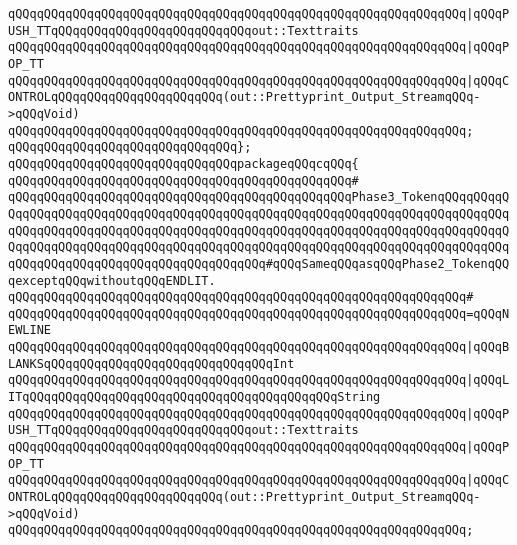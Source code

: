 \verb|qQQqqQQqqQQqqQQqqQQqqQQqqQQqqQQqqQQqqQQqqQQqqQQqqQQqqQQqqQQqqQQq|\verb#|qQQqPUSH_TTqQQqqQQqqQQqqQQqqQQqqQQqqQQqout::Texttraits#\newline
\verb|qQQqqQQqqQQqqQQqqQQqqQQqqQQqqQQqqQQqqQQqqQQqqQQqqQQqqQQqqQQqqQQq|\verb#|qQQqPOP_TT#\newline
\verb|qQQqqQQqqQQqqQQqqQQqqQQqqQQqqQQqqQQqqQQqqQQqqQQqqQQqqQQqqQQqqQQq|\verb#|qQQqCONTROLqQQqqQQqqQQqqQQqqQQqqQQq(out::Prettyprint_Output_StreamqQQq->qQQqVoid)#\newline
\verb|qQQqqQQqqQQqqQQqqQQqqQQqqQQqqQQqqQQqqQQqqQQqqQQqqQQqqQQqqQQqqQQq;|\newline
\verb|qQQqqQQqqQQqqQQqqQQqqQQqqQQqqQQq};|\newline
\newline
\verb|qQQqqQQqqQQqqQQqqQQqqQQqqQQqqQQqpackageqQQqcqQQq{|\newline
\verb|qQQqqQQqqQQqqQQqqQQqqQQqqQQqqQQqqQQqqQQqqQQqqQQq#|\newline
\verb|qQQqqQQqqQQqqQQqqQQqqQQqqQQqqQQqqQQqqQQqqQQqqQQqPhase3_TokenqQQqqQQqqQQqqQQqqQQqqQQqqQQqqQQqqQQqqQQqqQQqqQQqqQQqqQQqqQQqqQQqqQQqqQQqqQQqqQQqqQQqqQQqqQQqqQQqqQQqqQQqqQQqqQQqqQQqqQQqqQQqqQQqqQQqqQQqqQQqqQQqqQQqqQQqqQQqqQQqqQQqqQQqqQQqqQQqqQQqqQQqqQQqqQQqqQQqqQQqqQQqqQQqqQQqqQQqqQQqqQQqqQQqqQQqqQQqqQQqqQQqqQQqqQQqqQQq#qQQqSameqQQqasqQQqPhase2_TokenqQQqexceptqQQqwithoutqQQqENDLIT.|\newline
\verb|qQQqqQQqqQQqqQQqqQQqqQQqqQQqqQQqqQQqqQQqqQQqqQQqqQQqqQQqqQQqqQQq#|\newline
\verb|qQQqqQQqqQQqqQQqqQQqqQQqqQQqqQQqqQQqqQQqqQQqqQQqqQQqqQQqqQQqqQQq=qQQqNEWLINE|\newline
\verb|qQQqqQQqqQQqqQQqqQQqqQQqqQQqqQQqqQQqqQQqqQQqqQQqqQQqqQQqqQQqqQQq|\verb#|qQQqBLANKSqQQqqQQqqQQqqQQqqQQqqQQqqQQqqQQqInt#\newline
\verb|qQQqqQQqqQQqqQQqqQQqqQQqqQQqqQQqqQQqqQQqqQQqqQQqqQQqqQQqqQQqqQQq|\verb#|qQQqLITqQQqqQQqqQQqqQQqqQQqqQQqqQQqqQQqqQQqqQQqqQQqString#\newline
\verb|qQQqqQQqqQQqqQQqqQQqqQQqqQQqqQQqqQQqqQQqqQQqqQQqqQQqqQQqqQQqqQQq|\verb#|qQQqPUSH_TTqQQqqQQqqQQqqQQqqQQqqQQqqQQqout::Texttraits#\newline
\verb|qQQqqQQqqQQqqQQqqQQqqQQqqQQqqQQqqQQqqQQqqQQqqQQqqQQqqQQqqQQqqQQq|\verb#|qQQqPOP_TT#\newline
\verb|qQQqqQQqqQQqqQQqqQQqqQQqqQQqqQQqqQQqqQQqqQQqqQQqqQQqqQQqqQQqqQQq|\verb#|qQQqCONTROLqQQqqQQqqQQqqQQqqQQqqQQq(out::Prettyprint_Output_StreamqQQq->qQQqVoid)#\newline
\verb|qQQqqQQqqQQqqQQqqQQqqQQqqQQqqQQqqQQqqQQqqQQqqQQqqQQqqQQqqQQqqQQq;|\newline
